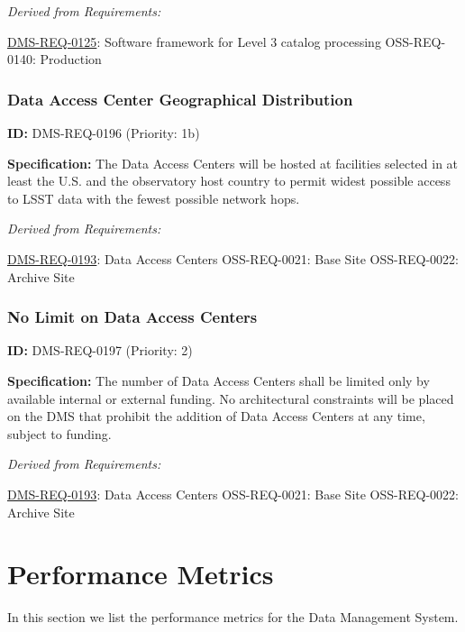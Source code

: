 \documentclass[SE,toc,lsstdraft]{lsstdoc}
\begin{document}
\emph{Derived from Requirements:}

\hyperref[DMS-REQ-0125]{DMS-REQ-0125}:
Software framework for Level 3 catalog processing \newline
OSS-REQ-0140:
Production \newline

\subsubsection{Data Access Center Geographical Distribution}

\label{DMS-REQ-0196}
\textbf{ID:} DMS-REQ-0196 (Priority: 1b)

\textbf{Specification:} The Data Access Centers will be hosted at facilities selected in at least the U.S. and the observatory host country to permit widest possible access to LSST data with the fewest possible network hops.

\emph{Derived from Requirements:}

\hyperref[DMS-REQ-0193]{DMS-REQ-0193}:
Data Access Centers \newline
OSS-REQ-0021:
Base Site \newline
OSS-REQ-0022:
Archive Site \newline

\subsubsection{No Limit on Data Access Centers}

\label{DMS-REQ-0197}
\textbf{ID:} DMS-REQ-0197 (Priority: 2)

\textbf{Specification: }The number of Data Access Centers shall be limited only by available internal or external funding.  No architectural constraints will be placed on the DMS that prohibit the addition of Data Access Centers at any time, subject to funding.

\emph{Derived from Requirements:}

\hyperref[DMS-REQ-0193]{DMS-REQ-0193}:
Data Access Centers \newline
OSS-REQ-0021:
Base Site \newline
OSS-REQ-0022:
Archive Site \newline

\section{Performance Metrics}

In this section we list the performance metrics for the Data Management System.
\end{document}
